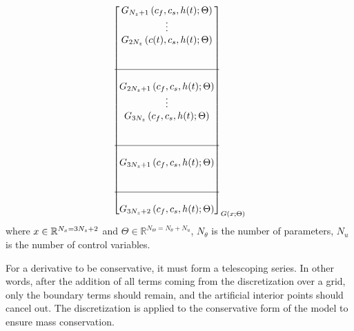 \documentclass[../Article_Model_Parameters.tex]{subfiles}
\begin{document}
{\begin{align*}
{\begin{bmatrix}
								{\color{black}G_{N_z+1}} \left( c_f,c_s,{\color{black}h}(t); \Theta \right)\\ 
								\vdots\\
								{\color{black}G_{2N_z}} \left( {\color{black}c}(t),c_s,{\color{black}h}(t); \Theta \right)\\ 
								\\ \\ \hline \\ 
								{\color{black}G_{2N_z+1}} \left( c_f,c_s,{\color{black}h}(t); \Theta \right) \\
								\vdots\\
								{\color{black}G_{3N_z}} \left( c_f,c_s,{\color{black}h}(t); \Theta \right) \\ 
								\\ \\ \hline \\
								{\color{black}G_{3N_z+1}} \left( c_f,c_s,{\color{black}h}(t); \Theta \right) \\
								\\ \\ \hline \\
								{\color{black}G_{3N_z+2}} \left( c_f,c_s,{\color{black}h}(t); \Theta \right) 
						\end{bmatrix}}_{{\color{black}G} \left( x; \Theta \right)} 
				\end{align*} }
			where ${\color{black}x} \in \mathbb{R}^{N_x = 3N_z+2} $ and $\Theta \in \mathbb{R}^{N_\Theta =  N_{\theta} + N_u } $, $N_{\theta}$ is the number of parameters, $N_{u}$ is the number of control variables.
			
			For a derivative to be conservative, it must form a telescoping series. In other words, after the addition of all terms coming from the discretization over a grid, only the boundary terms should remain, and the artificial interior points should cancel out. The discretization is applied to the conservative form of the model to ensure mass conservation.


			
		
\end{document}
